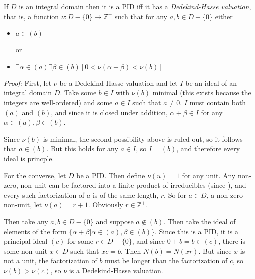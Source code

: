 \documentclass[12pt]{article}
\begin{document}
If $D$ is an integral domain then it is a PID iff it has a \emph{Dedekind-Hasse valuation}, that is, a function $\nu:D-\{0\}\rightarrow \mathbb{Z}^+$ such that for any $a,b\in D-\{0\}$ either 

\begin{itemize}
\item $a\in (b)$

or

\item $\exists \alpha\in(a)\exists\beta\in(b)\left[0<\nu(\alpha+\beta)<\nu(b)\right]$
\end{itemize}

{\em Proof:} First, let $\nu$ be a Dedekind-Hasse valuation and let $I$ be an ideal of an integral domain $D$.  Take some $b\in I$ with $\nu(b)$ minimal (this exists because the integers are well-ordered) and some $a\in I$ such that $a\neq 0$.  $I$ must contain both $(a)$ and $(b)$, and since it is closed under addition, $\alpha+\beta\in I$ for any $\alpha\in(a),\beta\in(b)$.

Since $\nu(b)$ is minimal, the second possibility above is ruled out, so it follows that $a\in (b)$.  But this holds for any $a\in I$, so $I=(b)$, and therefore every ideal is princple.

For the converse, let $D$ be a PID.  Then define $\nu(u)=1$ for any unit.  Any non-zero, non-unit can be factored into a finite product of irreducibles (since ), and every such factorization of $a$ is of the same length, $r$.  So for $a\in D$, a non-zero non-unit, let $\nu(a)=r+1$.  Obviously $r\in\mathbb{Z}^+$.

Then take any $a,b\in D-\{0\}$ and suppose $a\notin (b)$.  Then take the ideal of elements of the form $\{\alpha+\beta|\alpha\in (a), \beta\in(b)\}$.  Since this is a PID, it is a principal ideal $(c)$ for some $r\in D-\{0\}$, and since  $0+b=b\in(c)$, there is some non-unit $x\in D$ such that $xc=b$.  Then $N(b)=N(xr)$.  But since $x$ is not a unit, the factorization of $b$ must be longer than the factorization of $c$, so $\nu(b)>\nu(c)$, so $\nu$ is a Dedekind-Hasse valuation.
\end{document}

